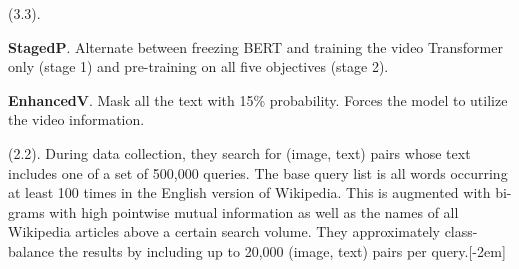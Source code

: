 \documentclass[11pt]{article}
\begin{document}

 (3.3). 
\begin{compactitem}
	\item \textbf{StagedP}. Alternate between freezing BERT and training the video Transformer only (stage 1) and pre-training on all five objectives (stage 2). 
	
	\item \textbf{EnhancedV}. Mask all the text with 15\% probability. Forces the model to utilize the video information. 
	
\end{compactitem}














 (2.2). During data collection, they search for (image, text) pairs whose text includes one of a set of 500,000 queries. The base query list is all words occurring at least 100 times in the English version of Wikipedia. This is augmented with bi-grams with high pointwise mutual information as well as the names of all Wikipedia articles above a certain search volume. They approximately class-balance the results by including up to 20,000 (image, text) pairs per query.[-2em]
	
\end{document}
